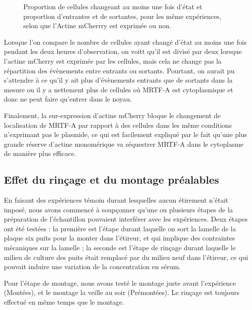 \documentclass{report}
\begin{document}
\begin{figure}
\caption{\label{AMC}Répartition initiale pour des cellules issues des mêmes expériences exprimant ou non le plasmide Actine mCherry (683 cellules témoin et 538 cellules expriment l'Actine mCherry). **** : $p<10^{-4}$}\caption{\label{AMC_transloc}Proportion de cellules changeant au moins une fois d'état et proportion d'entrantes et de sortantes, pour les même expériences, selon que l'Actine mCherrry est exprimée ou non.}
\end{figure}

Lorsque l'on compare le nombre de cellules ayant changé d'état au moins une fois pendant les deux heures d'observation, on voitt qu'il est divisé par deux lorsque l'actine mCherry est exprimée par les cellules, mais cela ne change pas la répartition des évènements entre entrants ou sortants. 
Pourtant, on aurait pu s'attendre à ce qu'il y ait plus d'évènements entrants que de sortants dans la mesure ou il y a nettement plus de cellules où MRTF-A est cytoplasmique et donc ne peut faire qu'entrer dans le noyau. 

Finalement, la sur-expression d'actine mCherry bloque le changement de localisation de MRTF-A par rapport à des cellules dans les même conditions n'exprimant pas le plasmide, ce qui est facilement expliqué par le fait qu'une plus grande réserve d'actine monomérique va séquestrer MRTF-A dans le cytoplasme de manière plus efficace.

\subsection{Effet du rinçage et du montage préalables \label{Rinçage}}

En faisant des expériences témoin durant lesquelles aucun étirement n'était imposé, nous avons commencé à soupçonner qu'une ou plusieurs étapes de la préparation de l'échantillon pouvaient interférer avec les expériences. 
Deux étapes ont été testées : la première est l'étape durant laquelle on sort la lamelle de la plaque six puits pour la monter dans l'étireur, et qui implique des contraintes mécaniques sur la lamelle ; la seconde est l'étape de rinçage durant laquelle le milieu de culture des puits était remplacé par du milieu neuf dans l'étireur, ce qui pouvait induire une variation de la concentration en sérum. 

Pour l'étape de montage, nous avons testé le montage juste avant l'expérience (Montées), et le montage la veille au soir (Prémontées). 
Le rinçage est toujours effectué en même temps que le montage. 
\end{document}
